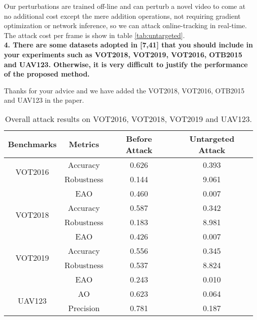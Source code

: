 \documentclass{article}
\begin{document}
Our perturbations are trained off-line and can perturb a novel video to come at no additional cost except the mere addition operations, not requiring gradient optimization or network inference, so we can attack online-tracking in real-time. The attack cost per frame is show in table \ref{tab:untargeted}.
\\[6pt]
\noindent \textbf{4. There are some datasets adopted in [7,41] that you should include in your experiments such as VOT2018, VOT2019, VOT2016, OTB2015 and UAV123. Otherwise, it is very difficult to justify the performance of the proposed method.}

Thanks for your advice and we have added the VOT2018, VOT2016, OTB2015 and UAV123 in the paper.

\begin{table}[h]
    \centering
    \caption{Overall attack results on VOT2016, VOT2018, VOT2019 and UAV123.}
    \begin{tabular}{c c | c | c}
    \toprule
    Benchmarks & Metrics & Before Attack    & Untargeted Attack  \\
    \midrule
    \multirow{2}{*}[-6pt]{VOT2016} 
    & Accuracy   & 0.626 & 0.393\\
    & Robustness & 0.144 & 9.061\\
    & EAO        & 0.460 & 0.007\\
    \midrule
    \multirow{2}{*}[-6pt]{VOT2018} 
    & Accuracy   & 0.587 & 0.342\\
    & Robustness & 0.183 & 8.981\\
    & EAO        & 0.426 & 0.007\\
    \midrule
    \multirow{2}{*}[-6pt]{VOT2019} 
    & Accuracy   & 0.556 & 0.345\\
    & Robustness & 0.537 & 8.824\\
    & EAO        & 0.243 & 0.010\\
    \midrule
    \multirow{3}{*}[+6pt]{UAV123} 
    & AO  & 0.623 & 0.064\\
    & Precision & 0.781 & 0.187\\
    \bottomrule
    \end{tabular}
    \label{tab:benchmark results1}
\end{table}
\end{document}
